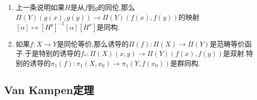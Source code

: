 \begin{enumerate}
\begin{proof}
		任取$X$的一条从$x_0$到$x_1$的道路$p$.我们期望证明有如下交换图表:
		$$\xymatrix{\Pi(f)(x_0)\ar[rr]^{[H^{x_0}]}\ar[d]_{[f\circ p]}&&\Pi(g)(x_0)\ar[d]^{[g\circ p]}\\\Pi(f)(x_1)\ar[rr]_{[H^{x_1}]}&&\Pi(g)(x_1)}$$
		
		换句话讲我们要证明有道路的同伦$g\circ p\ast H^{x_0}\sim H^{x_1}\ast f\circ p$.为此考虑$[0,1]\times[0,1]\to Y$的连续映射$F:(s,t)\mapsto H(p(s),t)$.那么$F(t,0)=f\circ p$,$F(0,t)=H^{x_0}(t)$,$F(1,t)=H^{x_1}(t)$,$F(t,1)=g\circ p$.所以只要构造$F(\lambda t,(1-\lambda)t)\ast F(\lambda+(1-\lambda)t,(1-\lambda)+\lambda t)$就是从$g\circ p\ast H^{x_0}$到$H^{x_1}\ast f\circ p$的道路同伦.
	\end{proof}
    \item 上一条说明如果$H$是从$f$到$g$的同伦,那么$\Pi(Y)(g(x),g(y))\to\Pi(Y)(f(x),f(y))$的映射$[\alpha]\mapsto[H^y]^{-1}[\alpha][H^x]$是同构.
    \item 如果$f:X\to Y$是同伦等价,那么诱导的$\Pi(f):\Pi(X)\to\Pi(Y)$是范畴等价函子.于是特别的诱导的$f_*:\Pi(X)(x,y)\to\Pi(Y)(f(x),f(y))$是双射.特别的诱导的$\pi_1(f):\pi_1(X,x_0)\to\pi_1(Y,f(x_0))$是群同构.
\end{enumerate}
\newpage
\subsection{Van Kampen定理}

